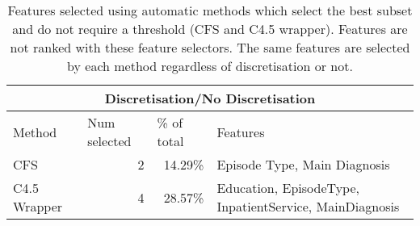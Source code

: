 \begin{table}[htbp]
\caption{Features selected using automatic methods which select the best subset and do not require a threshold (CFS and C4.5 wrapper). Features are not ranked with these feature selectors. The same features are selected by each method regardless of discretisation or not.}
\begin{tabular}{|l|r|r|p{8.5cm}|}
\hline
\multicolumn{ 4}{|c|}{Discretisation/No Discretisation} \\ \hline
Method & \multicolumn{1}{l|}{Num selected} & \multicolumn{1}{l|}{\% of total} & Features \\ \hline
CFS & 2 & 14.29\% & Episode Type, Main Diagnosis \\ \hline
C4.5 Wrapper & 4 & 28.57\% & Education, EpisodeType, InpatientService, MainDiagnosis \\ \hline
\end{tabular}
\end{table}
